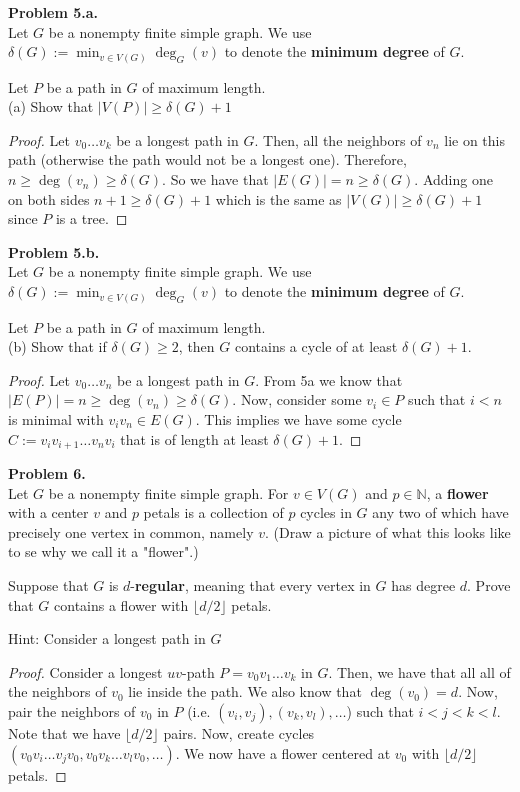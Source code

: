 \documentclass{article}
\newcommand{\N}{\mathbb{N}}
\newenvironment{hwproof}[2]
{
    \textbf{Problem #1.}\\
    #2
    \begin{proof}
}{
    \end{proof}
}
\begin{document}
\begin{hwproof}
    {5.a}
    {
        Let $G$ be a nonempty finite simple graph. We use
        $\delta(G) := \min_{v \in V(G)}\deg_G(v)$ to denote the \textbf{minimum degree}
        of $G$.

        Let $P$ be a path in $G$ of maximum length.\\
        (a) Show that $|V(P)| \geq \delta(G) + 1$
    }
    Let $v_0\dots v_k$ be a longest path in $G$. Then, all the neighbors of $v_n$ lie on
    this path (otherwise the path would not be a longest one). Therefore,
    $n \geq \deg(v_n) \geq \delta(G)$. So we have that $|E(G)| = n \geq \delta(G)$. Adding one on
    both sides $n + 1 \geq \delta(G) + 1$ which is the same as $|V(G)| \geq \delta(G) + 1$
    since $P$ is a tree.
\end{hwproof}

\begin{hwproof}
    {5.b}
    {
        Let $G$ be a nonempty finite simple graph. We use
        $\delta(G) := \min_{v \in V(G)}\deg_G(v)$ to denote the \textbf{minimum degree}
        of $G$.

        Let $P$ be a path in $G$ of maximum length.\\
        (b) Show that if $\delta(G) \geq 2$, then $G$ contains a cycle of at least
        $\delta(G) + 1$.
    }
    Let $v_0\dots v_n$ be a longest path in $G$. From 5a we know that
    $|E(P)| = n \geq \deg(v_n) \geq \delta(G)$. Now, consider some
    $v_i \in P$ such that $i < n$ is minimal with $v_iv_n \in E(G)$. This implies we have
    some cycle $C := v_iv_{i + 1}\dots v_nv_i$ that is of length at least $\delta(G) + 1$.
\end{hwproof}

\begin{hwproof}
    {6}
    {
        Let $G$ be a nonempty finite simple graph. For $v \in V(G)$ and $p \in \N$, a
        \textbf{flower} with a center $v$ and $p$ petals is a collection of $p$ cycles
        in $G$ any two of which have precisely one vertex in common, namely $v$.
        (Draw a picture of what this looks like to se why we call it a "flower".)

        Suppose that $G$ is $d$-\textbf{regular}, meaning that every vertex in $G$
        has degree $d$. Prove that $G$ contains a flower with $\lfloor d/2 \rfloor$
        petals.

        Hint: Consider a longest path in $G$
    }
    Consider a longest $uv$-path $P = v_0v_1\dots v_k$ in $G$. Then, we have that all
    all of the neighbors of $v_0$ lie inside the path. We also know that $\deg(v_0) = d$. Now,
    pair the neighbors of $v_0$ in $P$ (i.e. $(v_i, v_j), (v_k, v_l), \dots$)
    such that $i < j < k < l$.
    Note that we have $\lfloor d / 2 \rfloor$ pairs. Now, create cycles\\
    $(v_0v_i\dots v_jv_0, v_0v_k\dots v_lv_0, \dots)$. We now have a flower centered at $v_0$ with
    $\lfloor d/2 \rfloor$ petals.
\end{hwproof}
\end{document}
